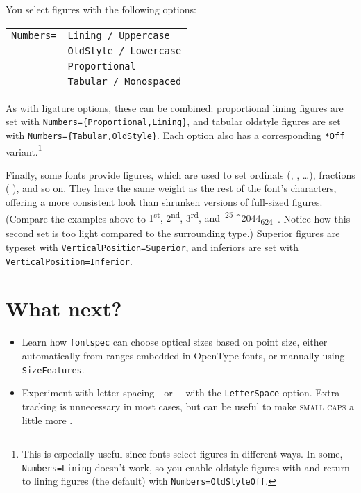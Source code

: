 You select figures with the following options:
\begin{leftfigure}
\begin{tabular}{l l}
\texttt{Numbers=} & \texttt{Lining / Uppercase} \\
 & \texttt{OldStyle / Lowercase} \\
 & \texttt{Proportional} \\
 & \texttt{Tabular / Monospaced}
\end{tabular}
\end{leftfigure}
As with ligature options, these can be combined:
proportional lining figures are set
with \texttt{Numbers=\allowbreak\{Proportional,\allowbreak Lining\}},
and tabular oldstyle figures are set with
\texttt{Numbers=\allowbreak\{Tabular,\allowbreak OldStyle\}}.
Each option also has a corresponding \verb|*Off|
variant.\punckern\footnote{This is especially useful since fonts
select figures in different ways.
In some, \texttt{Numbers=\allowbreak Lining} doesn't work,
so you enable oldstyle figures with 
and return to lining figures (the default) with
\texttt{Numbers=\allowbreak OldStyleOff}.}

Finally, some fonts provide  figures,
which are used to set ordinals
(,  , \dots),
fractions (\,\,), and so on.
They have the same weight as the rest of the font's characters,
offering a more consistent look than shrunken versions of full-sized figures.
(Compare the examples above to
{%
\mbox{1\textsuperscript{st}},
\mbox{2\textsuperscript{nd}},
\mbox{3\textsuperscript{rd}},
and
\,\mbox{\textsuperscript{25}^^^^2044\textsubscript{624}}%
\,}.
Notice how this second set is too light compared to the surrounding
type.)
Superior figures are typeset with
\texttt{VerticalPosition=\allowbreak Superior},
and inferiors are set with \texttt{VerticalPosition=\allowbreak Inferior}.

\section{What next?}
\begin{itemize}
\item Learn how \texttt{fontspec} can choose optical sizes based on
    point size, either automatically from ranges embedded in OpenType fonts,
    or manually using \texttt{SizeFeatures}.
\item Experiment with letter spacing---or ---with
    the \texttt{LetterSpace} option.
    Extra tracking is unnecessary in most cases,
    but can be useful to make \textsc{small caps}
    a little more .
\end{itemize}
